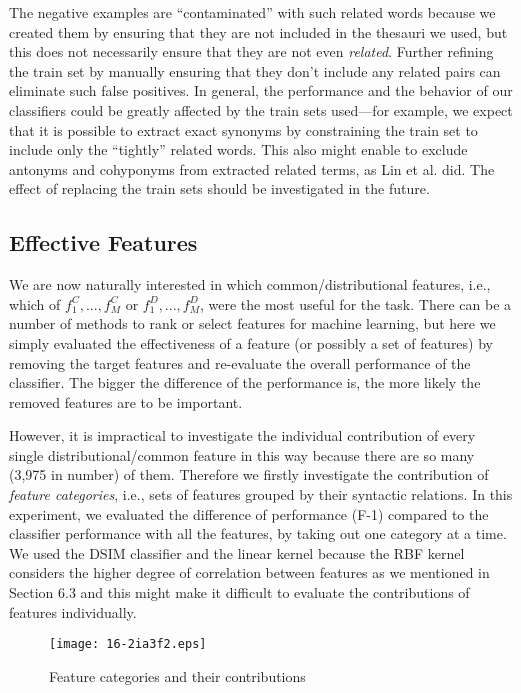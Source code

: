 \documentclass[english]{jnlp_1.4}
\begin{document}
The negative examples are ``contaminated'' with such related words
because we created them by ensuring that they are not included in the
thesauri we used, but this does not necessarily ensure that they are
not even \textit{related}. Further refining the train set by manually
ensuring that they don't include any related pairs can eliminate such
false positives. In general, the performance and the behavior of our
classifiers could be greatly affected by the train sets used---for
example, we expect that it is possible to extract exact synonyms by
constraining the train set to include only the ``tightly'' related
words. This also might enable to exclude antonyms and cohyponyms from
extracted related terms, as Lin et al. \cite{Lin:03} did. The effect
of replacing the train sets should be investigated in the future.


\subsection{Effective Features}

We are now naturally interested in which common/distributional
features, i.e., which of $f^C_1, ..., f^C_M$ or $f^D_1, ..., f^D_M$,
were the most useful for the task. There can be a number of methods to
rank or select features for machine learning, but here we simply
evaluated the effectiveness of a feature (or possibly a set of
features) by removing the target features and re-evaluate the overall
performance of the classifier. The bigger the difference of the
performance is, the more likely the removed features are to be
important.



However, it is impractical to investigate the individual contribution
of every single distributional/common feature in this way because
there are so many (3,975 in number) of them. Therefore we firstly
investigate the contribution of \textit{feature categories}, i.e., sets
of features grouped by their syntactic relations. In this experiment,
we evaluated the difference of performance (F-1) compared to the
classifier performance with all the features, by taking out one
category at a time. We used the DSIM classifier and the linear kernel
because the RBF kernel considers the higher degree of correlation
between features as we mentioned in Section 6.3 and this might make it
difficult to evaluate the contributions of features individually.

\begin{figure}[b]
\vspace{-1\baselineskip}
\begin{center}
\texttt{[image: 16-2ia3f2.eps]}
\end{center}
\caption{Feature categories and their contributions}
\label{fig_fcategories}
\end{figure}
\end{document}
